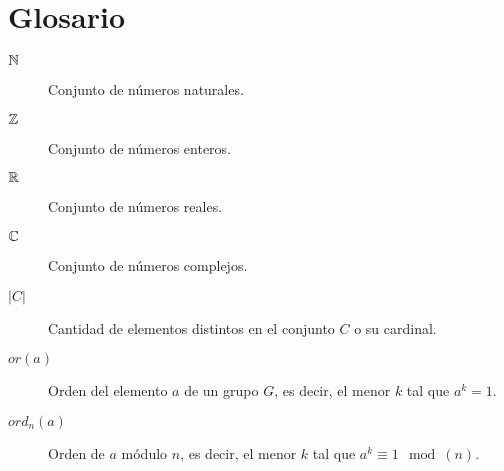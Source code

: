 
\chapter*{Glosario}

\begin{description}
	\item[$\mathbb{N}$] Conjunto de números naturales.
	
	\item[$\mathbb{Z}$] Conjunto de números enteros.
	
	\item[$\mathbb{R}$] Conjunto de números reales.
	
	\item[$\mathbb{C}$] Conjunto de números complejos.
	
	\item[$|C|$] Cantidad de elementos distintos en el conjunto $C$ o su cardinal.
	
	\item[$or(a)$] Orden del elemento $a$ de un grupo $G$, es decir, el menor $k$ tal que $a^k = 1$.
	
	\item[$ord_n(a)$] Orden de $a$ módulo $n$, es decir, el menor $k$ tal que $a^k \equiv 1 \mod(n)$.
\end{description}
\endinput
